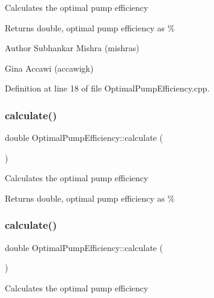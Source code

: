 Calculates the optimal pump efficiency

\begin{DoxyReturn}{Returns}
double, optimal pump efficiency as \%
\end{DoxyReturn}
\begin{DoxyAuthor}{Author}
Subhankar Mishra (mishras) 

Gina Accawi (accawigk) 
\end{DoxyAuthor}


Definition at line 18 of file Optimal\+Pump\+Efficiency.\+cpp.

\mbox{\label{class_optimal_pump_efficiency_ac40720d1fcdf40d8b364df37e58e7f4d}} 
\subsubsection{\texorpdfstring{calculate()}{calculate()}\hspace{0.1cm}{\footnotesize\ttfamily [2/3]}}
{\footnotesize\ttfamily double Optimal\+Pump\+Efficiency\+::calculate (\begin{DoxyParamCaption}{ }\end{DoxyParamCaption})}

Calculates the optimal pump efficiency

\begin{DoxyReturn}{Returns}
double, optimal pump efficiency as \% 
\end{DoxyReturn}
\mbox{\label{class_optimal_pump_efficiency_ac40720d1fcdf40d8b364df37e58e7f4d}} 
\subsubsection{\texorpdfstring{calculate()}{calculate()}\hspace{0.1cm}{\footnotesize\ttfamily [3/3]}}
{\footnotesize\ttfamily double Optimal\+Pump\+Efficiency\+::calculate (\begin{DoxyParamCaption}{ }\end{DoxyParamCaption})}

Calculates the optimal pump efficiency

